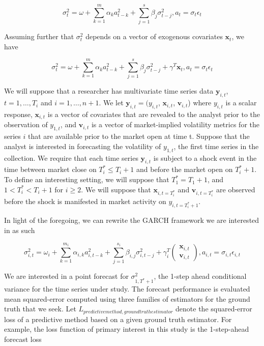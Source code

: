 \documentclass[11pt]{article}
\newcommand{\x}{\textbf{x}}
\newcommand{\y}{\textbf{y}}
\theoremstyle{definition}
\begin{document}
$$\sigma_{t}^{2} = \omega + \sum^{m}_{k=1}\alpha_{k}a^{2}_{t-k} + \sum_{j=1}^{s}\beta_{j}\sigma_{t-j}^{2}, a_{t} = \sigma_{t}\epsilon_{t}$$

Assuming further that $\sigma^{2}_{t}$ depends on a vector of exogenous covariates $\x_{t}$, we have

$$\sigma_{t}^{2} = \omega+ \sum^{m}_{k=1}\alpha_{k}a^{2}_{t-k} + \sum_{j=1}^{s}\beta_{j}\sigma_{t-j}^{2} + \gamma^{T}\x_{t}, a_{t} = \sigma_{t}\epsilon_{t}$$


We will suppose that a researcher has multivariate time series data $\y_{i,t}$, $t = 1, \ldots,  T_i$ and $i = 1, \ldots, n+1$. We let $\y_{i,t} = (y_{i,t}$, $\x_{i,t}$, $\textbf{v}_{i,t}$) where $y_{i,t}$ is a scalar response,  $\x_{i,t}$ is a vector of covariates that are revealed to the analyst prior to the observation of $y_{1,t}$, and $\textbf{v}_{i,t}$ is a vector of market-implied volatility metrics for the series $i$ that are available prior to the market open at time t.  Suppose that the analyst is interested in forecasting the volatility of $y_{1,t}$, the first time series in the collection.  We require that each time series $\y_{i,t}$ is subject to a shock event in the time between market close on $T^*_i \leq T_i + 1$ and before the market open on $T^*_i+1$. To define an interesting setting, we will suppose that $T^*_1 = T_1 + 1$, and $1 < T^*_i < T_i + 1$ for $i \geq 2$. 
We will suppose that $\x_{i,t=T^*_i}$ and $\textbf{v}_{i,t=T^*_i}$ are observed before the shock is manifested in market activity on $y_{i,t=T^*_i+1}$.

In light of the foregoing, we can rewrite the GARCH framework we are interested in as such

$$\sigma_{i,t}^{2} = \omega_{i} + \sum^{m_{i}}_{k=1}\alpha_{i,k}a^{2}_{i,t-k} + \sum_{j=1}^{s_{i}}\beta_{i,j}\sigma_{i,t-j}^{2} + \gamma_{i}^{T} \begin{pmatrix}
          \x_{i,t} \\
           \textbf{v}_{i,t}
           \end{pmatrix}, a_{i,t} = \sigma_{i,t}\epsilon_{i,t}$$


We are interested in a point forecast for $\sigma^{2}_{1,T^{*}+1}$, the 1-step ahead conditional variance for the time series under study.  The forecast performance is evaluated mean squared-error computed using three families of estimators for the ground truth that we seek.  Let $L_{predictive method, ground truth estimator} $ denote the squared-error loss of a predictive method based on a given ground truth estimator.  For example, the loss function of primary interest in this study is the 1-step-ahead forecast loss
\end{document}
